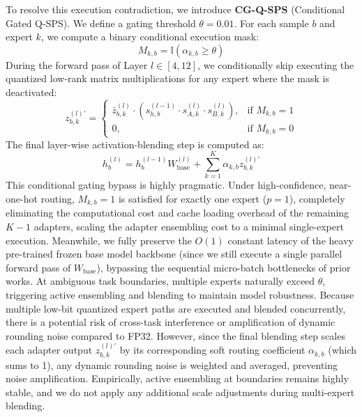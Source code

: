 To resolve this execution contradiction, we introduce \textbf{CG-Q-SPS} (Conditional Gated Q-SPS). We define a gating threshold $\theta = 0.01$. For each sample $b$ and expert $k$, we compute a binary conditional execution mask:
\begin{equation}
  M_{k, b} = \mathbb{I}(\alpha_{k, b} \ge \theta)
\end{equation}
During the forward pass of Layer $l \in [4, 12]$, we conditionally skip executing the quantized low-rank matrix multiplications for any expert where the mask is deactivated:
\begin{equation}
  z^{(l)\prime}_{b, k} = 
  \begin{cases}
    \bar{z}_{b, k}^{(l)} \cdot \left( s_{h, b}^{(l-1)} \cdot s_{A, k}^{(l)} \cdot s_{B, k}^{(l)} \right), & \text{if } M_{k, b} = 1 \\
    0, & \text{if } M_{k, b} = 0
  \end{cases}
\end{equation}
The final layer-wise activation-blending step is computed as:
\begin{equation}
  h_b^{(l)} = h_b^{(l-1)} W_{\text{base}}^{(l)} + \sum_{k=1}^K \alpha_{k, b} z^{(l)\prime}_{b, k}
\end{equation}
This conditional gating bypass is highly pragmatic. Under high-confidence, near-one-hot routing, $M_{k, b} = 1$ is satisfied for exactly one expert ($p=1$), completely eliminating the computational cost and cache loading overhead of the remaining $K-1$ adapters, scaling the adapter ensembling cost to a minimal single-expert execution. Meanwhile, we fully preserve the $O(1)$ constant latency of the heavy pre-trained frozen base model backbone (since we still execute a single parallel forward pass of $W_{\text{base}}$), bypassing the sequential micro-batch bottlenecks of prior works. At ambiguous task boundaries, multiple experts naturally exceed $\theta$, triggering active ensembling and blending to maintain model robustness. Because multiple low-bit quantized expert paths are executed and blended concurrently, there is a potential risk of cross-task interference or amplification of dynamic rounding noise compared to FP32. However, since the final blending step scales each adapter output $z^{(l)\prime}_{b, k}$ by its corresponding soft routing coefficient $\alpha_{k, b}$ (which sums to 1), any dynamic rounding noise is weighted and averaged, preventing noise amplification. Empirically, active ensembling at boundaries remains highly stable, and we do not apply any additional scale adjustments during multi-expert blending.

